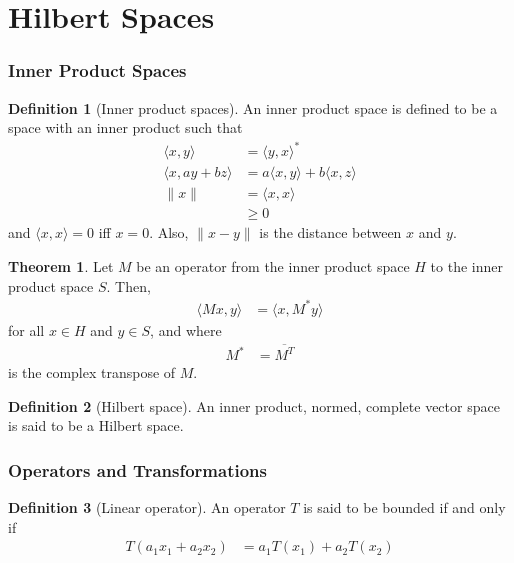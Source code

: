 \documentclass[titlepage, fleqn, a4paper, 12pt, twoside]{article}
\theoremstyle{definition}
\newtheorem{definition}{Definition}
\theoremstyle{theorem}
\newtheorem{theorem}{Theorem}
\begin{document}
\clearpage
\part{Hilbert Spaces}

\section{Inner Product Spaces}

\begin{definition}[Inner product spaces]
	An inner product space is defined to be a space with an inner product such that
	\begin{align*}
		\langle x,y \rangle &= \langle y,x \rangle^*\\
		\langle x , a y + b z \rangle &= a \langle x,y \rangle + b \langle x,z \rangle\\
		\|x\| &= \langle x,x \rangle\\
		&\ge 0
	\end{align*}
	and $\langle x,x \rangle = 0$ iff $x = 0$.
	Also, $\|x - y\|$ is the distance between $x$ and $y$.
\end{definition}

\begin{theorem}
	Let $M$ be an operator from the inner product space $H$ to the inner product space $S$.
	Then,
	\begin{align*}
		\langle M x , y \rangle &= \langle x , M^* y \rangle
	\end{align*}
	for all $x \in H$ and $y \in S$, and where
	\begin{align*}
		M^* &= \overline{M^T}
	\end{align*}
	is the complex transpose of $M$.
\end{theorem}

\begin{definition}[Hilbert space]
	An inner product, normed, complete vector space is said to be a Hilbert space.
\end{definition}

\section{Operators and Transformations}

\begin{definition}[Linear operator]
	An operator $T$ is said to be bounded if and only if
	\begin{align*}
		T(a_1 x_1 + a_2 x_2) &= a_1 T(x_1) + a_2 T(x_2)
	\end{align*}
\end{definition}
\end{document}
